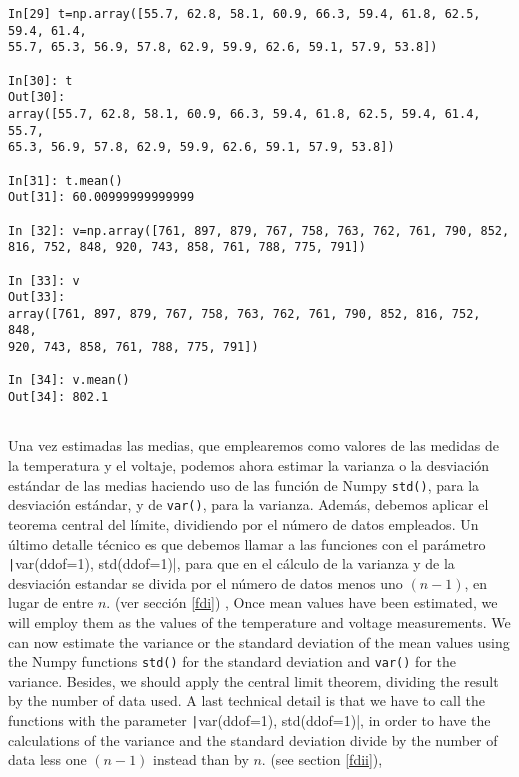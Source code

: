 \begin{center}
	\begin{minipage}{\textwidth}
		\begin{verbatim}
In[29] t=np.array([55.7, 62.8, 58.1, 60.9, 66.3, 59.4, 61.8, 62.5, 59.4, 61.4,
55.7, 65.3, 56.9, 57.8, 62.9, 59.9, 62.6, 59.1, 57.9, 53.8])

In[30]: t
Out[30]: 
array([55.7, 62.8, 58.1, 60.9, 66.3, 59.4, 61.8, 62.5, 59.4, 61.4, 55.7,
65.3, 56.9, 57.8, 62.9, 59.9, 62.6, 59.1, 57.9, 53.8])

In[31]: t.mean()
Out[31]: 60.00999999999999
			
In [32]: v=np.array([761, 897, 879, 767, 758, 763, 762, 761, 790, 852,
816, 752, 848, 920, 743, 858, 761, 788, 775, 791])
			
In [33]: v
Out[33]: 
array([761, 897, 879, 767, 758, 763, 762, 761, 790, 852, 816, 752, 848,
920, 743, 858, 761, 788, 775, 791])
			
In [34]: v.mean()
Out[34]: 802.1
					
		\end{verbatim}
	\end{minipage}
\end{center}

\begin{paracol}{2}
Una vez estimadas las medias, que emplearemos como valores de las medidas de la temperatura y el voltaje,  podemos ahora estimar la varianza o la desviación estándar de las medias haciendo uso de las función de Numpy \texttt{std()}, para la desviación estándar,  y de \texttt{var()}, para la varianza.  Además, debemos aplicar el teorema central del límite, dividiendo por el número de datos empleados. Un último detalle técnico es que debemos llamar a las funciones con el parámetro \texttt|var(ddof=1), std(ddof=1)|, para que en el cálculo de la varianza y de la desviación estandar se divida por el número de datos menos uno $(n-1)$, en lugar de entre $n$. (ver sección \ref{fdi}) , 
\switchcolumn
Once mean values have been estimated, we will employ them as the values of the temperature and voltage measurements. We can now estimate the variance or the standard deviation of the mean values using the Numpy functions \texttt{std()} for the standard deviation and \texttt{var()} for the variance. Besides, we should apply the central limit theorem, dividing the result by the number of data used. A last technical detail is that we have to call the functions with the parameter \texttt|var(ddof=1), std(ddof=1)|, in order to have the calculations of the variance and the standard deviation divide by the number of data less one $(n-1)$ instead than by $n$. (see section \ref{fdii}),    
\end{paracol}

